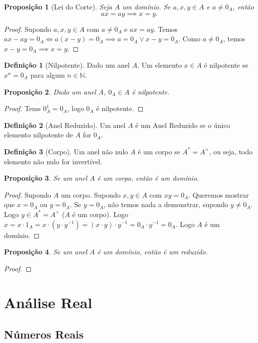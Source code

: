 \documentclass{article}
\theoremstyle{plain}
\newtheorem{prop}{Proposição}[section]
\theoremstyle{definition}
\newtheorem{definicao}{Definição}[section]
\theoremstyle{remark}
\begin{document}
\begin{prop}[Lei do Corte]
	Seja $A$ um domínio. Se $a,x,y \in A$ e $a\neq 0_A$, então $$ ax = ay \implies x = y.$$
\end{prop}
\begin{proof}
	Supondo $a,x,y\in A$ com $a\neq 0_A$ e $ax=ay$. Temos $ax -ay = 0_A  \iff a(x-y) = 0_A \implies a = 0_A \lor x-y = 0_A$.  Como $a\neq 0_A$, temos $x-y = 0_A \implies x = y$.
\end{proof}
\begin{definicao}[Nilpotente]
	Dado um anel $A$. Um elemento $x\in A$ é nilpotente se $x^n = 0_A$ para algum $n\in \mathbb{N}$.
\end{definicao}
\begin{prop}
	Dado um anel $A$, $0_A \in A$ é nilpotente.
\end{prop}
\begin{proof}
	Tems $0_A^1 = 0_A $, logo $0_A$ é nilpotente.
\end{proof}
\begin{definicao}[Anel Reduzido]
	Um anel $A$ é um Anel Reduzido  se o único elemento nilpotente de $A$ for $0_A$.
\end{definicao}
\begin{definicao}[Corpo]
	Um anel não nulo $A$ é um corpo se $A^{*} = A^{\times}$, ou seja, todo elemento não nulo for invertível.
\end{definicao}

\begin{prop}
	Se um anel $A$ é um corpo, então é um domínio.
\end{prop}
\begin{proof}
	Supondo $A$ um corpo. Supondo $x,y\in A$ com $xy = 0_A$. Queremos mostrar que $x =0_A$ ou $y = 0_A$. Se $y = 0_A$, não temos nada a demonstrar, supondo $y\neq 0_A$. Logo $y \in A^{*} = A^{\times}$ ($A$ é um corpo). Logo $x =x\cdot 1_A =  x\cdot (y\cdot y^{-1}) = (x\cdot y)\cdot y^{-1} = 0_A\cdot y^{-1} = 0_A$. Logo $A$ é um domínio.
\end{proof}
\begin{prop}
	Se um anel $A$ é um domínio, então é um reduzido.
\end{prop}
\begin{proof}
\end{proof}
\section{Análise Real}
\subsection{Números Reais}
\end{document}
